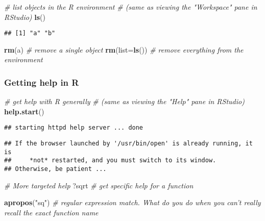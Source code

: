 \documentclass[
]{article}
\newenvironment{Shaded}{\begin{snugshade}}{\end{snugshade}}
\newcommand{\CommentTok}[1]{\textcolor[rgb]{0.56,0.35,0.01}{\textit{#1}}}
\newcommand{\DataTypeTok}[1]{\textcolor[rgb]{0.13,0.29,0.53}{#1}}
\newcommand{\KeywordTok}[1]{\textcolor[rgb]{0.13,0.29,0.53}{\textbf{#1}}}
\newcommand{\NormalTok}[1]{#1}
\newcommand{\StringTok}[1]{\textcolor[rgb]{0.31,0.60,0.02}{#1}}
\begin{document}
\begin{Shaded}
\begin{Highlighting}[]
\CommentTok{# list objects in the R environment}
\CommentTok{# (same as viewing the "Workspace" pane in RStudio)}
\KeywordTok{ls}\NormalTok{()}
\end{Highlighting}
\end{Shaded}

\begin{verbatim}
## [1] "a" "b"
\end{verbatim}

\begin{Shaded}
\begin{Highlighting}[]
\KeywordTok{rm}\NormalTok{(a)           }\CommentTok{# remove a single object}
\KeywordTok{rm}\NormalTok{(}\DataTypeTok{list=}\KeywordTok{ls}\NormalTok{())       }\CommentTok{# remove everything from the environment}
\end{Highlighting}
\end{Shaded}

\hypertarget{getting-help-in-r}{%
\subsubsection{Getting help in R}\label{getting-help-in-r}}

\begin{Shaded}
\begin{Highlighting}[]
\CommentTok{# get help with R generally}
\CommentTok{# (same as viewing the "Help" pane in RStudio)}
\KeywordTok{help.start}\NormalTok{()}
\end{Highlighting}
\end{Shaded}

\begin{verbatim}
## starting httpd help server ... done
\end{verbatim}

\begin{verbatim}
## If the browser launched by '/usr/bin/open' is already running, it is
##     *not* restarted, and you must switch to its window.
## Otherwise, be patient ...
\end{verbatim}

\begin{Shaded}
\begin{Highlighting}[]
\CommentTok{# More targeted help}
\NormalTok{?sqrt           }\CommentTok{# get specific help for a function}

\KeywordTok{apropos}\NormalTok{(}\StringTok{"sq"}\NormalTok{)       }\CommentTok{# regular expression match. What do you do when you can't really recall the exact function name}
\end{Highlighting}
\end{Shaded}
\end{document}
